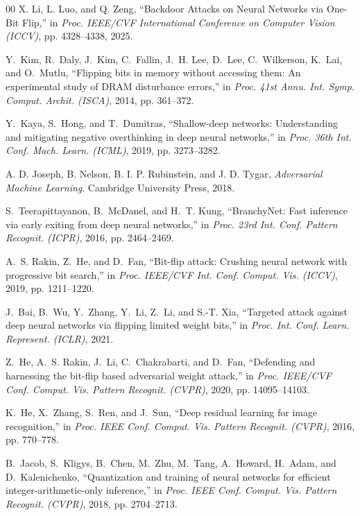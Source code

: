 \documentclass[conference,10pt]{IEEEtran}
\begin{document}
\begin{thebibliography}{00}
X. Li, L. Luo, and Q. Zeng,
``Backdoor Attacks on Neural Networks via One-Bit Flip,''
in \textit{Proc. IEEE/CVF International Conference on Computer Vision (ICCV)},
pp. 4328--4338, 2025.

Y.~Kim, R.~Daly, J.~Kim, C.~Fallin, J.~H. Lee, D.~Lee, C.~Wilkerson, K.~Lai, and O.~Mutlu, ``Flipping bits in memory without accessing them: An experimental study of DRAM disturbance errors,'' in \textit{Proc. 41st Annu. Int. Symp. Comput. Archit. (ISCA)}, 2014, pp. 361--372.

Y.~Kaya, S.~Hong, and T.~Dumitras, ``Shallow-deep networks: Understanding and mitigating negative overthinking in deep neural networks,'' in \textit{Proc. 36th Int. Conf. Mach. Learn. (ICML)}, 2019, pp. 3273--3282.

A. D. Joseph, B. Nelson, B. I. P. Rubinstein, and J. D. Tygar,
\newblock \emph{Adversarial Machine Learning}.
\newblock Cambridge University Press, 2018.

S.~Teerapittayanon, B.~McDanel, and H.~T. Kung, ``BranchyNet: Fast inference via early exiting from deep neural networks,'' in \textit{Proc. 23rd Int. Conf. Pattern Recognit. (ICPR)}, 2016, pp. 2464--2469.

A.~S. Rakin, Z.~He, and D.~Fan, ``Bit-flip attack: Crushing neural network with progressive bit search,'' in \textit{Proc. IEEE/CVF Int. Conf. Comput. Vis. (ICCV)}, 2019, pp. 1211--1220.

J.~Bai, B.~Wu, Y.~Zhang, Y.~Li, Z.~Li, and S.-T. Xia, ``Targeted attack against deep neural networks via flipping limited weight bits,'' in \textit{Proc. Int. Conf. Learn. Represent. (ICLR)}, 2021.

Z.~He, A.~S. Rakin, J.~Li, C.~Chakrabarti, and D.~Fan, ``Defending and harnessing the bit-flip based adversarial weight attack,'' in \textit{Proc. IEEE/CVF Conf. Comput. Vis. Pattern Recognit. (CVPR)}, 2020, pp. 14095--14103.

K.~He, X.~Zhang, S.~Ren, and J.~Sun, ``Deep residual learning for image recognition,'' in \textit{Proc. IEEE Conf. Comput. Vis. Pattern Recognit. (CVPR)}, 2016, pp. 770--778.

B.~Jacob, S.~Kligys, B.~Chen, M.~Zhu, M.~Tang, A.~Howard, H.~Adam, and D.~Kalenichenko, ``Quantization and training of neural networks for efficient integer-arithmetic-only inference,'' in \textit{Proc. IEEE Conf. Comput. Vis. Pattern Recognit. (CVPR)}, 2018, pp. 2704--2713.


\end{thebibliography}
\end{document}
